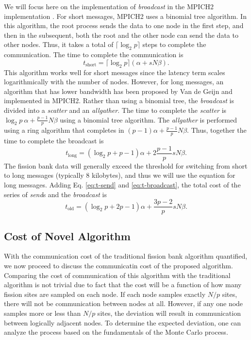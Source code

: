We will focus here on the implementation of \emph{broadcast} in the
MPICH2 implementation \cite{mpich}. For short messages, MPICH2 uses a
binomial tree algorithm. In this algorithm, the root process sends the
data to one node in the first step, and then in the subsequent, both
the root and the other node can send the data to other nodes. Thus, it
takes a total of $\lceil \log_2 p \rceil$ steps to complete the
communication. The time to complete the communication is
\begin{equation}
  t_{\text{short}} = \lceil \log_2 p \rceil \left ( \alpha + sN\beta
  \right ).
\end{equation}
This algorithm works well for short messages since the latency term
scales logarithmically with the number of nodes. However, for long
messages, an algorithm that has lower bandwidth has been proposed by
Van de Geijn \cite{vandegeijn} and implemented in MPICH2. Rather than
using a binomial tree, the \emph{broadcast} is divided into a
\emph{scatter} and an \emph{allgather}. The time to complete the
\emph{scatter} is $ \log_2 p \: \alpha + \frac{p-1}{p} N\beta$ using a
binomial tree algorithm. The \emph{allgather} is performed using a
ring algorithm that completes in $(p-1) \alpha + \frac{p-1}{p}
N\beta$. Thus, together the time to complete the broadcast is
\begin{equation}\label{eq:t-broadcast}
  t_{\text{long}} = \left ( \log_2 p + p - 1 \right ) \alpha + 2
  \frac{p-1}{p} sN\beta.
\end{equation}
The fission bank data will generally exceed the threshold for
switching from short to long messages (typically 8 kilobytes), and
thus we will use the equation for long messages. Adding
Eq. \ref{eq:t-send} and \ref{eq:t-broadcast}, the total cost of the
series of \emph{send}s and the \emph{broadcast} is
\begin{equation}
  t_{\text{old}} = \left ( \log_2 p + 2p - 1 \right ) \alpha +
  \frac{3p-2}{p} sN\beta.
\end{equation}

\subsection{Cost of Novel Algorithm}

With the communication cost of the traditional fission bank algorithm
quantified, we now proceed to discuss the communicatin cost of the
proposed algorithm. Comparing the cost of communication of this
algorithm with the traditional algorithm is not trivial due to fact
that the cost will be a function of how many fission sites are sampled
on each node. If each node samples exactly $N/p$ sites, there will not
be communication between nodes at all. However, if any one node
samples more or less than $N/p$ sites, the deviation will result in
communication between logically adjacent nodes. To determine the
expected deviation, one can analyze the process based on the
fundamentals of the Monte Carlo process.

